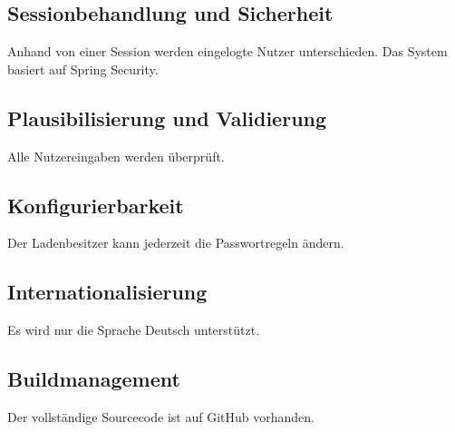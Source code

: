 \documentclass[pdftex,12pt,a4paper]{article}
\begin{document}
\subsection{Sessionbehandlung und Sicherheit}
Anhand von einer Session werden eingelogte Nutzer unterschieden. Das System basiert auf Spring Security.

\subsection{Plausibilisierung und Validierung}
Alle Nutzereingaben werden \"uberpr\"uft.

\subsection{Konfigurierbarkeit}
Der Ladenbesitzer kann jederzeit die Passwortregeln \"andern.

\subsection{Internationalisierung}
Es wird nur die Sprache Deutsch unterst\"utzt.

\subsection{Buildmanagement}
Der vollst\"andige Sourcecode ist auf GitHub vorhanden.
\end{document}
